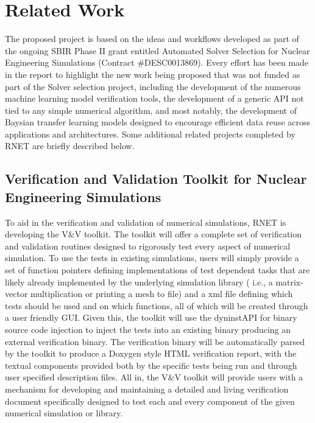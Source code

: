 
\section{Related Work}
\label{related}

The proposed project is based on the ideas and workflows developed as part of the ongoing SBIR Phase II grant entitled Automated Solver Selection for Nuclear Engineering Simulations (Contract \#DESC0013869). Every effort has been made in the report to highlight the new work being proposed that was not funded as part of the Solver selection project, including the development of the numerous machine learning model verification tools, the development of a generic API not tied to any simple numerical algorithm, and most notably, the development of Baysian transfer learning models designed to encourage efficient data reuse across applications and architectures. Some additional related projects completed by RNET are briefly described below. 

\subsection{Verification and Validation Toolkit for Nuclear Engineering Simulations} 
  To aid in the verification and validation of numerical simulations, RNET is developing the V\&V toolkit. The toolkit will offer a complete set of verification and validation routines designed to rigorously test every aspect of numerical simulation. To use the tests in existing simulations, users will simply provide a set of function pointers defining implementations of test dependent tasks that are likely already implemented by the underlying simulation library ( i.e., a matrix-vector multiplication or printing a mesh to file) and a xml file defining which tests should be used and on which functions, all of which will be created through a user friendly GUI. Given this, the toolkit will use the dyninstAPI for binary source code injection to inject the tests into an existing binary producing an external verification binary. The verification binary will be automatically parsed by the toolkit to produce a Doxygen style HTML verification report, with the textual components provided both by the specific tests being run and through user specified description files. All in, the V\&V toolkit will provide users with a mechanism for developing and maintaining a detailed and living verification document specifically designed to test each and every component of the given numerical simulation or library.    

